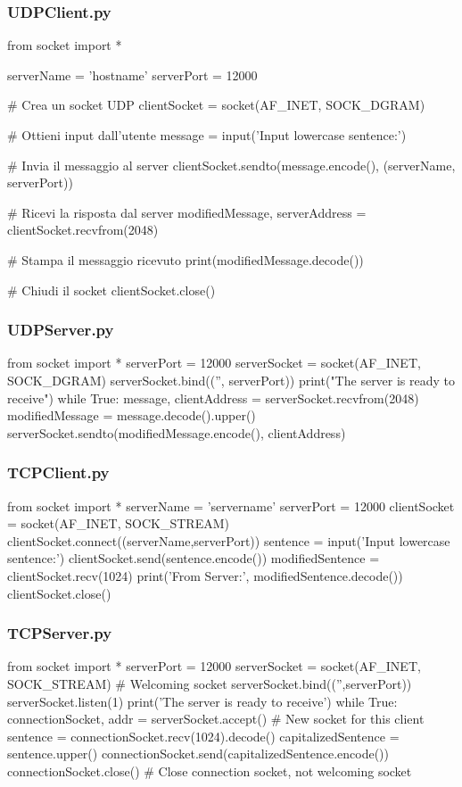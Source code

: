 \documentclass{article}
\begin{document}
\subsubsection{UDPClient.py}
\begin{pythoncode}
from socket import *

serverName = 'hostname'
serverPort = 12000

# Crea un socket UDP
clientSocket = socket(AF_INET, SOCK_DGRAM)

# Ottieni input dall'utente
message = input('Input lowercase sentence:')

# Invia il messaggio al server
clientSocket.sendto(message.encode(), (serverName, serverPort))

# Ricevi la risposta dal server
modifiedMessage, serverAddress = clientSocket.recvfrom(2048)

# Stampa il messaggio ricevuto
print(modifiedMessage.decode())

# Chiudi il socket
clientSocket.close()
\end{pythoncode}

\subsubsection{UDPServer.py}
\begin{pythoncode}
from socket import *
serverPort = 12000
serverSocket = socket(AF_INET, SOCK_DGRAM)
serverSocket.bind(('', serverPort))
print("The server is ready to receive")
while True:
    message, clientAddress = serverSocket.recvfrom(2048)
    modifiedMessage = message.decode().upper()
    serverSocket.sendto(modifiedMessage.encode(), clientAddress)
\end{pythoncode}

\subsubsection{TCPClient.py}
\begin{pythoncode}
from socket import *
serverName = 'servername'
serverPort = 12000
clientSocket = socket(AF_INET, SOCK_STREAM)
clientSocket.connect((serverName,serverPort))
sentence = input('Input lowercase sentence:')
clientSocket.send(sentence.encode())
modifiedSentence = clientSocket.recv(1024)
print('From Server:', modifiedSentence.decode())
clientSocket.close()
\end{pythoncode}

\subsubsection{TCPServer.py}
\begin{pythoncode}
from socket import *
serverPort = 12000
serverSocket = socket(AF_INET, SOCK_STREAM) # Welcoming socket
serverSocket.bind(('',serverPort))
serverSocket.listen(1)
print('The server is ready to receive')
while True:
    connectionSocket, addr = serverSocket.accept() # New socket for this client
    sentence = connectionSocket.recv(1024).decode()
    capitalizedSentence = sentence.upper()
    connectionSocket.send(capitalizedSentence.encode())
    connectionSocket.close() # Close connection socket, not welcoming socket
\end{pythoncode}
\end{document}
